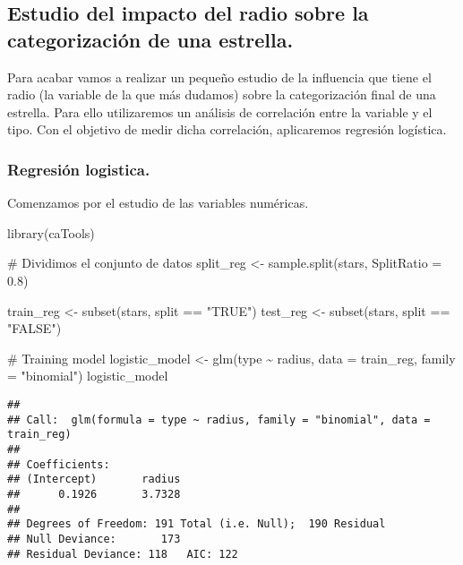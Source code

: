 \documentclass[
]{article}
\newenvironment{Shaded}{\begin{snugshade}}{\end{snugshade}}
\newcommand{\AttributeTok}[1]{\textcolor[rgb]{0.80,0.80,0.80}{#1}}
\newcommand{\CommentTok}[1]{\textcolor[rgb]{0.50,0.62,0.50}{#1}}
\newcommand{\FloatTok}[1]{\textcolor[rgb]{0.75,0.75,0.82}{#1}}
\newcommand{\FunctionTok}[1]{\textcolor[rgb]{0.94,0.94,0.56}{#1}}
\newcommand{\NormalTok}[1]{\textcolor[rgb]{0.80,0.80,0.80}{#1}}
\newcommand{\OtherTok}[1]{\textcolor[rgb]{0.94,0.94,0.56}{#1}}
\newcommand{\SpecialCharTok}[1]{\textcolor[rgb]{0.86,0.64,0.64}{#1}}
\newcommand{\StringTok}[1]{\textcolor[rgb]{0.80,0.58,0.58}{#1}}
\begin{document}
\hypertarget{estudio-del-impacto-del-radio-sobre-la-categorizaciuxf3n-de-una-estrella.}{%
\subsection{Estudio del impacto del radio sobre la categorización de una
estrella.}\label{estudio-del-impacto-del-radio-sobre-la-categorizaciuxf3n-de-una-estrella.}}

Para acabar vamos a realizar un pequeño estudio de la influencia que
tiene el radio (la variable de la que más dudamos) sobre la
categorización final de una estrella. Para ello utilizaremos un análisis
de correlación entre la variable y el tipo. Con el objetivo de medir
dicha correlación, aplicaremos regresión logística.

\hypertarget{regresiuxf3n-logistica.}{%
\subsubsection{Regresión logistica.}\label{regresiuxf3n-logistica.}}

Comenzamos por el estudio de las variables numéricas.

\begin{Shaded}
\begin{Highlighting}[]
\FunctionTok{library}\NormalTok{(caTools)}

\CommentTok{\# Dividimos el conjunto de datos}
\NormalTok{split\_reg }\OtherTok{\textless{}{-}} \FunctionTok{sample.split}\NormalTok{(stars, }\AttributeTok{SplitRatio =} \FloatTok{0.8}\NormalTok{)}
   
\NormalTok{train\_reg }\OtherTok{\textless{}{-}} \FunctionTok{subset}\NormalTok{(stars, split }\SpecialCharTok{==} \StringTok{"TRUE"}\NormalTok{)}
\NormalTok{test\_reg }\OtherTok{\textless{}{-}} \FunctionTok{subset}\NormalTok{(stars, split }\SpecialCharTok{==} \StringTok{"FALSE"}\NormalTok{)}
   
\CommentTok{\# Training model}
\NormalTok{logistic\_model }\OtherTok{\textless{}{-}} \FunctionTok{glm}\NormalTok{(type }\SpecialCharTok{\textasciitilde{}}\NormalTok{ radius, }
                      \AttributeTok{data =}\NormalTok{ train\_reg, }
                      \AttributeTok{family =} \StringTok{"binomial"}\NormalTok{)}
\NormalTok{logistic\_model}
\end{Highlighting}
\end{Shaded}

\begin{verbatim}
## 
## Call:  glm(formula = type ~ radius, family = "binomial", data = train_reg)
## 
## Coefficients:
## (Intercept)       radius  
##      0.1926       3.7328  
## 
## Degrees of Freedom: 191 Total (i.e. Null);  190 Residual
## Null Deviance:       173 
## Residual Deviance: 118   AIC: 122
\end{verbatim}
\end{document}
